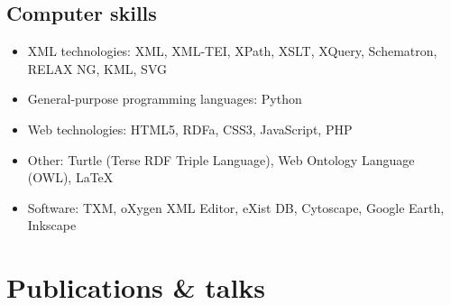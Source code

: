\documentclass[11pt, a4paper]{article}
\begin{document}
\subsection{Computer skills}
\begin{itemize}[noitemsep]
 \item XML technologies: XML, XML-TEI, XPath, XSLT, XQuery, Schematron, RELAX NG, KML, SVG
 \item General-purpose programming languages: Python
 \item Web technologies: HTML5, RDFa, CSS3, JavaScript, PHP
 \item Other: Turtle (Terse RDF Triple Language), Web Ontology Language (OWL), LaTeX
 \item Software: TXM, oXygen XML Editor, eXist DB, Cytoscape, Google Earth, Inkscape 
\end{itemize}



\section{Publications \& talks}
\end{document}
